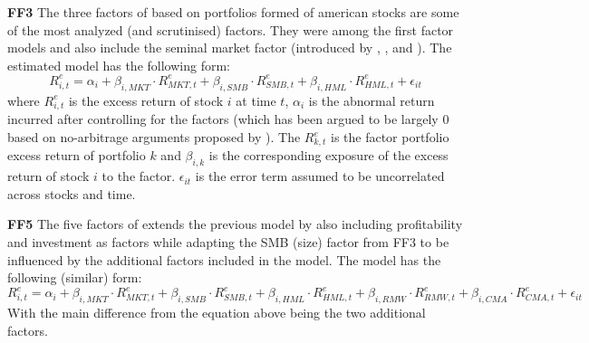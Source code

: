 \textbf{FF3} The three factors of \cite{fama1992cross} based on portfolios formed of american stocks are some of the most analyzed (and scrutinised) factors. They were among the first factor models and also include the seminal market factor (introduced by \cite{treynor1961toward}, \cite{sharpe1964capital}, \cite{lintner1965security} and \cite{mossin1966equilibrium}). The estimated model has the following form:
\begin{equation}
	R_{i,t}^{e}=\alpha_{i}+\beta_{i,MKT}\cdot R_{MKT,t}^{e}+\beta_{i,SMB}\cdot R_{SMB,t}^{e}+\beta_{i,HML}\cdot R_{HML,t}^{e}+\epsilon_{it}
\end{equation}
where $R_{i,t}^{e}$ is the excess return of stock $i$ at time $t$, $\alpha_{i}$ is the abnormal return incurred after controlling for the factors (which has been argued to be largely 0 based on no-arbitrage arguments proposed by \cite{ross1976arbitrage}). The $R_{k,t}^{e}$ is the factor portfolio excess return of portfolio $k$ and $\beta_{i,k}$ is the corresponding exposure of the excess return of stock $i$ to the factor. $\epsilon_{it}$ is the error term assumed to be uncorrelated across stocks and time.

\textbf{FF5} The five factors of \cite{fama2015five} extends the previous model by also including profitability and investment as factors while adapting the SMB (size) factor from FF3 to be influenced by the additional factors included in the model. The model has the following (similar) form:
\begin{equation}
	R_{i,t}^{e}=\alpha_{i}+\beta_{i,MKT}\cdot R_{MKT,t}^{e}+\beta_{i,SMB}\cdot R_{SMB,t}^{e}+\beta_{i,HML}\cdot R_{HML,t}^{e}+\beta_{i,RMW}\cdot R_{RMW,t}^{e}+\beta_{i,CMA}\cdot R_{CMA,t}^{e}+\epsilon_{it}
\end{equation}
With the main difference from the equation above being the two additional factors.

